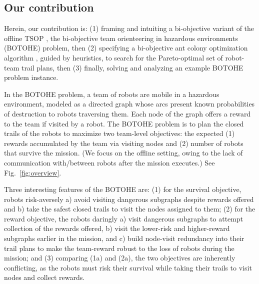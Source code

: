 \documentclass[fleqn,10pt,lineno]{wlpeerj}
\begin{document}
\subsection{Our contribution}
Herein, our contribution is:
(1) framing and intuiting a bi-objective variant of the offline TSOP \cite{jorgensen2018team,jorgensen2017matroid,jorgensen2024matroid}, the bi-objective team orienteering in hazardous environments (BOTOHE) problem, then 
(2) specifying a bi-objective ant colony optimization algorithm \cite{iredi2001bi}, guided by heuristics, to search for the Pareto-optimal set of robot-team trail plans, then
(3) finally, solving and analyzing an example BOTOHE problem instance.

In the BOTOHE problem, 
a team of robots are mobile in a hazardous environment, modeled as a directed graph whose arcs present known probabilities of destruction to robots traversing them.
Each node of the graph offers a reward to the team if visited by a robot.
The BOTOHE problem is to plan the closed trails of the robots to maximize two team-level objectives: the expected
(1) rewards accumulated by the team via visiting nodes and
(2) number of robots that survive the mission. 
(We focus on the offline setting, owing to the lack of communication with/between robots after the mission executes.)
See Fig.~\ref{fig:overview}.

Three interesting features of the BOTOHE are: 
(1) for the survival objective, robots risk-aversely a) avoid visiting dangerous subgraphs despite rewards offered and b) take the safest closed trails to visit the nodes assigned to them;
(2) for the reward objective, the robots daringly a) visit dangerous subgraphs to attempt collection of the rewards offered, b) visit the lower-risk and higher-reward subgraphs earlier in the mission, and c) build node-visit redundancy into their trail plans to make the team-reward robust to the loss of robots during the mission; and
(3) comparing (1a) and (2a), the two objectives are inherently conflicting, as the robots must risk their survival while taking their trails to visit nodes and collect rewards.%
\end{document}
